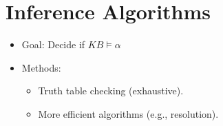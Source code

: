 \section{Inference Algorithms}
\begin{itemize}
    \item Goal: Decide if $KB \models \alpha$
    \item Methods:
    \begin{itemize}
        \item Truth table checking (exhaustive).
        \item More efficient algorithms (e.g., resolution).
    \end{itemize}
\end{itemize}

